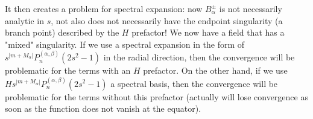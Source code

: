 %
It then creates a problem for spectral expansion: now $B_\alpha^\pm$ is not necessarily analytic in $s$, not also does not necessarily have the endpoint singularity (a branch point) described by the $H$ prefactor! We now have a field that has a "mixed" singularity. 
If we use a spectral expansion in the form of $s^{|m + M_\alpha|} P_n^{(\alpha, \beta)}(2s^2 - 1)$ in the radial direction, then the convergence will be problematic for the terms with an $H$ prefactor. On the other hand, if we use $H s^{|m + M_\alpha|} P_n^{(\alpha, \beta)}(2s^2 - 1)$ a spectral basis, then the convergence will be problematic for the terms without this prefactor (actually will lose convergence as soon as the function does not vanish at the equator).

